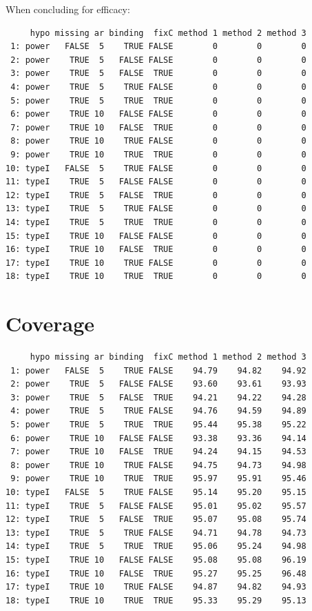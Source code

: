 \documentclass[12pt]{article}
\begin{document}
\clearpage

When concluding for efficacy:
\begin{verbatim}
     hypo missing ar binding  fixC method 1 method 2 method 3
 1: power   FALSE  5    TRUE FALSE        0        0        0
 2: power    TRUE  5   FALSE FALSE        0        0        0
 3: power    TRUE  5   FALSE  TRUE        0        0        0
 4: power    TRUE  5    TRUE FALSE        0        0        0
 5: power    TRUE  5    TRUE  TRUE        0        0        0
 6: power    TRUE 10   FALSE FALSE        0        0        0
 7: power    TRUE 10   FALSE  TRUE        0        0        0
 8: power    TRUE 10    TRUE FALSE        0        0        0
 9: power    TRUE 10    TRUE  TRUE        0        0        0
10: typeI   FALSE  5    TRUE FALSE        0        0        0
11: typeI    TRUE  5   FALSE FALSE        0        0        0
12: typeI    TRUE  5   FALSE  TRUE        0        0        0
13: typeI    TRUE  5    TRUE FALSE        0        0        0
14: typeI    TRUE  5    TRUE  TRUE        0        0        0
15: typeI    TRUE 10   FALSE FALSE        0        0        0
16: typeI    TRUE 10   FALSE  TRUE        0        0        0
17: typeI    TRUE 10    TRUE FALSE        0        0        0
18: typeI    TRUE 10    TRUE  TRUE        0        0        0
\end{verbatim}

\clearpage

\section{Coverage}
\label{sec:orgb2557ce}

\begin{verbatim}
     hypo missing ar binding  fixC method 1 method 2 method 3
 1: power   FALSE  5    TRUE FALSE    94.79    94.82    94.92
 2: power    TRUE  5   FALSE FALSE    93.60    93.61    93.93
 3: power    TRUE  5   FALSE  TRUE    94.21    94.22    94.28
 4: power    TRUE  5    TRUE FALSE    94.76    94.59    94.89
 5: power    TRUE  5    TRUE  TRUE    95.44    95.38    95.22
 6: power    TRUE 10   FALSE FALSE    93.38    93.36    94.14
 7: power    TRUE 10   FALSE  TRUE    94.24    94.15    94.53
 8: power    TRUE 10    TRUE FALSE    94.75    94.73    94.98
 9: power    TRUE 10    TRUE  TRUE    95.97    95.91    95.46
10: typeI   FALSE  5    TRUE FALSE    95.14    95.20    95.15
11: typeI    TRUE  5   FALSE FALSE    95.01    95.02    95.57
12: typeI    TRUE  5   FALSE  TRUE    95.07    95.08    95.74
13: typeI    TRUE  5    TRUE FALSE    94.71    94.78    94.73
14: typeI    TRUE  5    TRUE  TRUE    95.06    95.24    94.98
15: typeI    TRUE 10   FALSE FALSE    95.08    95.08    96.19
16: typeI    TRUE 10   FALSE  TRUE    95.27    95.25    96.48
17: typeI    TRUE 10    TRUE FALSE    94.87    94.82    94.93
18: typeI    TRUE 10    TRUE  TRUE    95.33    95.29    95.13
\end{verbatim}
\end{document}
